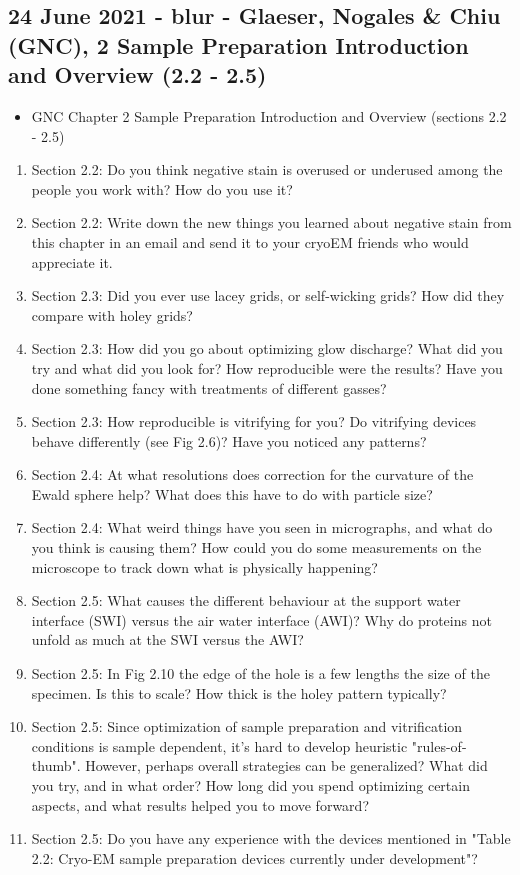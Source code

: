 \documentclass[11pt, oneside]{article}   	%
\begin{document}

\subsection{24 June 2021 - blur - Glaeser, Nogales \& Chiu (GNC), 2 Sample Preparation Introduction and Overview (2.2 - 2.5)}
\begin{itemize}
	\item GNC Chapter 2 Sample Preparation Introduction and Overview (sections 2.2 - 2.5)
\end{itemize}
\begin{enumerate}
	\item Section 2.2: Do you think negative stain is overused or underused among the people you work with? How do you use it?
	\item Section 2.2: Write down the new things you learned about negative stain from this chapter in an email and send it to your cryoEM friends who would appreciate it.
	\item Section 2.3: Did you ever use lacey grids, or self-wicking grids? How did they compare with holey grids?
	\item Section 2.3: How did you go about optimizing glow discharge? What did you try and what did you look for? How reproducible were the results? Have you done something fancy with treatments of different gasses?
	\item Section 2.3: How reproducible is vitrifying for you? Do vitrifying devices behave differently (see Fig 2.6)? Have you noticed any patterns?
	\item Section 2.4: At what resolutions does correction for the curvature of the Ewald sphere help? What does this have to do with particle size?
	\item Section 2.4: What weird things have you seen in micrographs, and what do you think is causing them? How could you do some measurements on the microscope to track down what is physically happening?
	\item Section 2.5: What causes the different behaviour at the support water interface (SWI) versus the air water interface (AWI)? Why do proteins not unfold as much at the SWI versus the AWI?
	\item Section 2.5: In Fig 2.10 the edge of the hole is a few lengths the size of the specimen. Is this to scale? How thick is the holey pattern typically?
	\item Section 2.5: Since optimization of sample preparation and vitrification conditions is sample dependent, it's hard to develop heuristic "rules-of-thumb". However, perhaps overall strategies can be generalized? What did you try, and in what order? How long did you spend optimizing certain aspects, and what results helped you to move forward?
	\item Section 2.5: Do you have any experience with the devices mentioned in "Table 2.2: Cryo-EM sample preparation devices currently under development"?
\end{enumerate}
\end{document}
